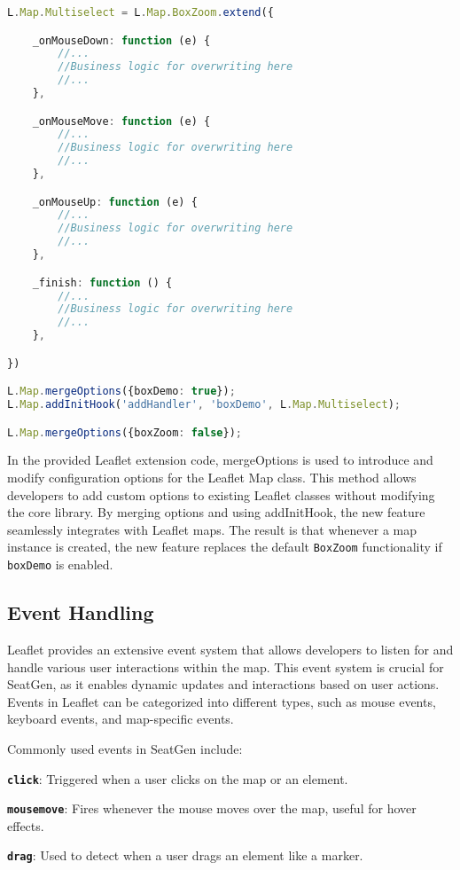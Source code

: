 \begin{lstlisting}[language=Typescript, caption={Modifying Leaflet Features},label={lst:leaflet-modification}]
L.Map.Multiselect = L.Map.BoxZoom.extend({

    _onMouseDown: function (e) {
        //...
        //Business logic for overwriting here
        //...
    },

    _onMouseMove: function (e) {
        //...
        //Business logic for overwriting here
        //...
    },

    _onMouseUp: function (e) {
        //...
        //Business logic for overwriting here
        //...
    },

    _finish: function () {
        //...
        //Business logic for overwriting here
        //...
    },

})

L.Map.mergeOptions({boxDemo: true});
L.Map.addInitHook('addHandler', 'boxDemo', L.Map.Multiselect);

L.Map.mergeOptions({boxZoom: false});

\end{lstlisting}


In the provided Leaflet extension code, mergeOptions is used to introduce and modify configuration options for the Leaflet Map class. This method allows developers to add custom options to existing Leaflet classes without modifying the core library. By merging options and using addInitHook, the new feature seamlessly integrates with Leaflet maps. The result is that whenever a map instance is created, the new feature replaces the default \texttt{BoxZoom} functionality if \texttt{boxDemo} is enabled.

\subsection{Event Handling}
Leaflet provides an extensive event system that allows developers to listen for and handle various user interactions within the map. This event system is crucial for SeatGen, as it enables dynamic updates and interactions based on user actions. Events in Leaflet can be categorized into different types, such as mouse events, keyboard events, and map-specific events.

Commonly used events in SeatGen include:
\begin{compactitem}
\item \texttt{\textbf{click}}: Triggered when a user clicks on the map or an element.
\item \texttt{\textbf{mousemove}}: Fires whenever the mouse moves over the map, useful for hover effects.
\item \texttt{\textbf{drag}}: Used to detect when a user drags an element like a marker.
\end{compactitem}

